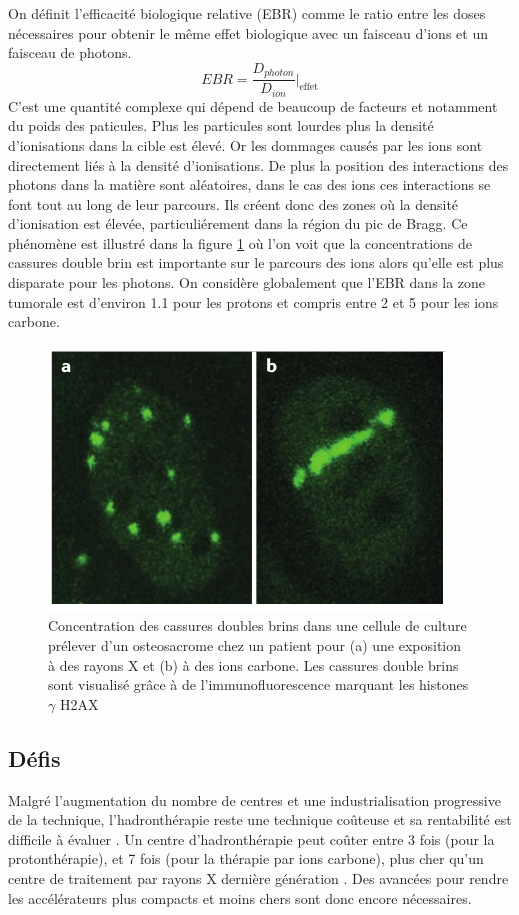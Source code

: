 \documentclass[11pt,a4paper,oldfontcommands]{memoir}
\begin{document}
On définit l'efficacité biologique relative (EBR) comme le ratio entre les doses nécessaires pour obtenir le même effet biologique avec un faisceau d'ions et un faisceau de photons.
$$EBR = \frac{D_{photon}}{D_{ion}}\bigg|_{\text{effet}}$$
C'est une quantité complexe qui dépend de beaucoup de facteurs et notamment du poids des paticules. Plus les particules sont lourdes plus la densité d'ionisations dans la cible est élevé. Or les dommages causés par les ions sont directement liés à la densité d'ionisations. De plus la position des interactions des photons dans la matière sont aléatoires, dans le cas des ions ces interactions se font tout au long de leur parcours. Ils créent donc des zones où la densité d'ionisation est élevée, particuliérement dans la région du pic de Bragg. Ce phénomène est illustré dans la figure \ref{LET} où l'on voit que la concentrations de cassures double brin est importante sur le parcours des ions alors qu'elle est plus disparate pour les photons. On considère globalement que l'EBR dans la zone tumorale est d'environ 1.1 pour les protons et compris entre 2 et 5 pour les ions carbone\cite{Choi}. 
\begin{figure}
    \centering
    \includegraphics[scale = 0.7]{intro/LETDSS.png}
    \caption{Concentration des cassures doubles brins dans une cellule de culture prélever d'un osteosacrome chez un patient pour (a) une exposition à des rayons X et (b) à des ions carbone. Les cassures double brins sont visualisé grâce à de l'immunofluorescence marquant les histones $ \gamma$ H2AX \cite{Durante2017}}
    \label{LET}
\end{figure}
\subsection{Défis}
Malgré l'augmentation du nombre de centres et une industrialisation progressive de la technique, l'hadronthérapie reste une technique coûteuse et sa rentabilité est difficile à évaluer \cite{LIEVENS2013134}. Un centre d'hadronthérapie peut coûter entre 3 fois (pour la protonthérapie), et 7 fois (pour la thérapie par ions carbone), plus cher qu'un centre de traitement par rayons X dernière génération \cite{Nupecc}. Des avancées pour rendre les accélérateurs plus compacts et moins chers sont donc encore nécessaires.
\end{document}
